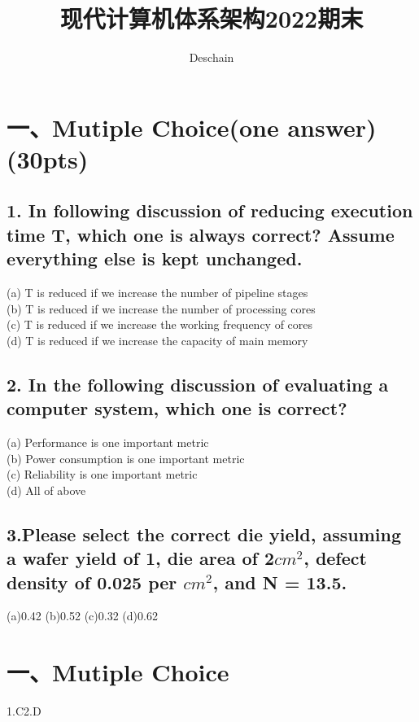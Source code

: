 \documentclass[UTF8]{ctexart}
\title{现代计算机体系架构2022期末}
\author{Deschain}
\begin{document}
\maketitle
\section*{一、Mutiple Choice(one answer)(30pts)}
\subsection*{1. In following discussion of reducing execution time T, which one is {\bfseries always correct}? Assume everything else is kept unchanged.}
(a) T is reduced if we increase the number of pipeline stages\\
(b) T is reduced if we increase the number of processing cores\\
(c) T is reduced if we increase the working frequency of cores\\
(d) T is reduced if we increase the capacity of main memory\\
\subsection*{2. In the following discussion of evaluating a computer system, which one is correct?}
(a) Performance is one important metric\\
(b) Power consumption is one important metric\\
(c) Reliability is one important metric\\
(d) All of above\\
\subsection*{3.Please select the correct die yield, assuming a wafer yield of 1, die area of 2$cm^2$, defect density of 0.025 per $cm^2$, and N = 13.5.}
(a)0.42
(b)0.52
(c)0.32
(d)0.62


\newpage
\section*{一、Mutiple Choice }
1.C\quad 2.D\quad
\end{document}
